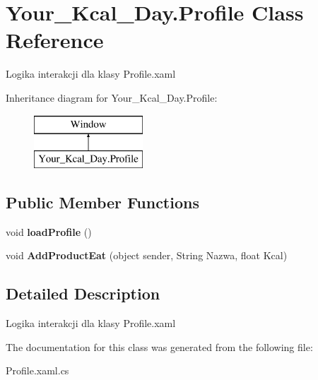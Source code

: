 \hypertarget{class_your___kcal___day_1_1_profile}{}\section{Your\+\_\+\+Kcal\+\_\+\+Day.\+Profile Class Reference}
\label{class_your___kcal___day_1_1_profile}


Logika interakcji dla klasy Profile.\+xaml  


Inheritance diagram for Your\+\_\+\+Kcal\+\_\+\+Day.\+Profile\+:\begin{figure}[H]
\begin{center}
\leavevmode
\includegraphics[height=2.000000cm]{class_your___kcal___day_1_1_profile}
\end{center}
\end{figure}
\subsection*{Public Member Functions}
\begin{DoxyCompactItemize}
\item 
\mbox{\label{class_your___kcal___day_1_1_profile_acc45bd5d6551fe68d9002fd98950a5e1}} 
void {\bfseries load\+Profile} ()
\item 
\mbox{\label{class_your___kcal___day_1_1_profile_a3c485ba8aabef7cc18dc6ae359160fd9}} 
void {\bfseries Add\+Product\+Eat} (object sender, String Nazwa, float Kcal)
\end{DoxyCompactItemize}


\subsection{Detailed Description}
Logika interakcji dla klasy Profile.\+xaml 



The documentation for this class was generated from the following file\+:\begin{DoxyCompactItemize}
\item 
Profile.\+xaml.\+cs\end{DoxyCompactItemize}
